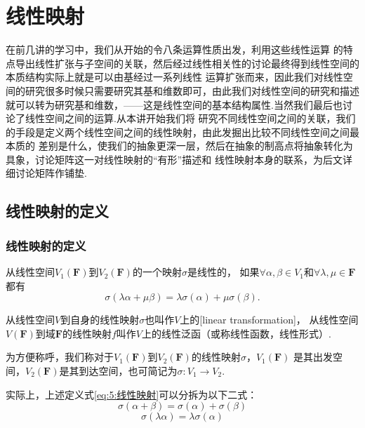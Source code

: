 \chapter{线性映射}

在前几讲的学习中，我们从开始的令八条运算性质出发，利用这些线性运算
的特点导出线性扩张与子空间的关联，然后经过线性相关性的讨论最终得到线性空间的本质结构实际上就是可以由基经过一系列线性
运算扩张而来，因此我们对线性空间的研究很多时候只需要研究其基和维数即可，由此我们对线性空间的研究和描述
就可以转为研究基和维数，——这是线性空间的基本结构属性.当然我们最后也讨论了线性空间之间的运算.从本讲开始我们将
研究不同线性空间之间的关联，我们的手段是定义两个线性空间之间的线性映射，由此发掘出比较不同线性空间之间最本质的
差别是什么，使我们的抽象更深一层，然后在抽象的制高点将抽象转化为具象，讨论矩阵这一对线性映射的``有形''描述和
线性映射本身的联系，为后文详细讨论矩阵作铺垫.

\section{线性映射的定义}
\subsection{线性映射的定义}
\begin{definition}
    从线性空间$V_1(\mathbf{F})$到$V_2(\mathbf{F})$的一个映射$\sigma$是线性的，
    如果$\forall \alpha,\beta \in V_1$和$\forall \lambda,\mu \in \mathbf{F}$都有
    \begin{equation}\label{eq:5:线性映射}
        \sigma(\lambda\alpha+\mu\beta)=\lambda\sigma(\alpha)+\mu\sigma(\beta).
    \end{equation}

    从线性空间$V$到自身的线性映射$\sigma$也叫作$V$上的[linear transformation]，
    从线性空间$V(\mathbf{F})$到域$\mathbf{F}$的线性映射$f$叫作$V$上的线性泛函（或称线性函数，线性形式）.

    为方便称呼，我们称对于$V_1(\mathbf{F})$到$V_2(\mathbf{F})$的线性映射$\sigma$，$V_1(\mathbf{F})$
    是其出发空间，$V_2(\mathbf{F})$是其到达空间，也可简记为$\sigma: V_1\to V_2$.
\end{definition}
实际上，上述定义式\eqref{eq:5:线性映射}可以分拆为以下二式：
\begin{equation} \tag{加性} %
    \sigma(\alpha+\beta)=\sigma(\alpha)+\sigma(\beta)
\end{equation}
\begin{equation} \tag{齐次性}
    \sigma(\lambda\alpha)=\lambda\sigma(\alpha)
\end{equation}

